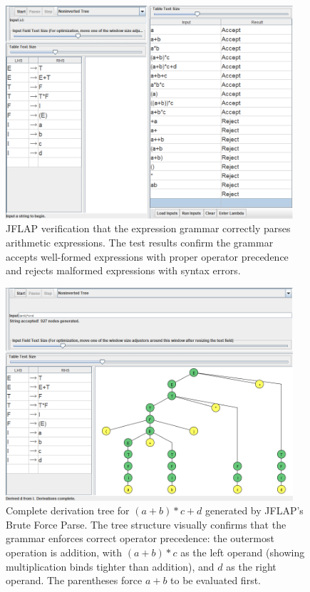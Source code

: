 \documentclass[12pt]{article}
\begin{document}
\begin{figure}[H]
\centering
\includegraphics[width=0.95\textwidth]{Problem 3/Problem 3.png}
\caption{JFLAP verification that the expression grammar correctly parses arithmetic expressions. The test results confirm the grammar accepts well-formed expressions with proper operator precedence and rejects malformed expressions with syntax errors.}
\label{fig:problem3_tests}
\end{figure}

\begin{figure}[H]
\centering
\includegraphics[width=0.95\textwidth]{Problem 3/Problem 3 B.png}
\caption{Complete derivation tree for $(a+b)*c+d$ generated by JFLAP's Brute Force Parse. The tree structure visually confirms that the grammar enforces correct operator precedence: the outermost operation is addition, with $(a+b)*c$ as the left operand (showing multiplication binds tighter than addition), and $d$ as the right operand. The parentheses force $a+b$ to be evaluated first.}
\label{fig:problem3_tree}
\end{figure}
\end{document}
